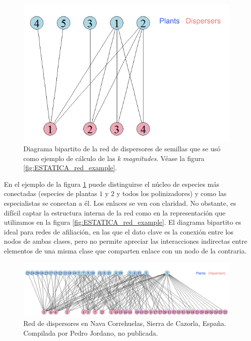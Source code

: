 \begin{figure}[h!]
\centering
\includegraphics[scale=0.33]{Figures/VIS_SD_030_bipartita.png}
\caption{Diagrama bipartito de la red de dispersores de semillas que se usó como ejemplo de cálculo de las \textit{k magnitudes}. Véase la figura \ref{fig:ESTATICA_red_example}.}
\label{fig:Figures/VIS_SD_030_bipartita}
\end{figure}

En el ejemplo de la figura \ref{fig:Figures/VIS_SD_030_bipartita} puede distinguirse el núcleo de especies más conectadas (especies de plantas $1$ y $2$ y todos los polinizadores) y como las especialistas se conectan a él. Los enlaces se ven con claridad. No obstante, es difícil captar la estructura interna de la red como en la representación que utilizamos en la figura \ref{fig:ESTATICA_red_example}. El diagrama bipartito es ideal para redes de afiliación, en las que el dato clave es la conexión entre los nodos de ambas clases, pero no permite apreciar las interacciones indirectas entre elementos de una misma clase que comparten enlace con un nodo de la contraria.

\begin{figure}[h!]
\centering
\includegraphics[scale=0.4]{Figures/VIS_bipartito_SD_020.png}
\caption{Red de dispersores en Nava Correhuelas, Sierra de Cazorla, España. Compilada por Pedro Jordano, no publicada.}
\label{fig:VIS_bipartito_SD_020}
\end{figure}

